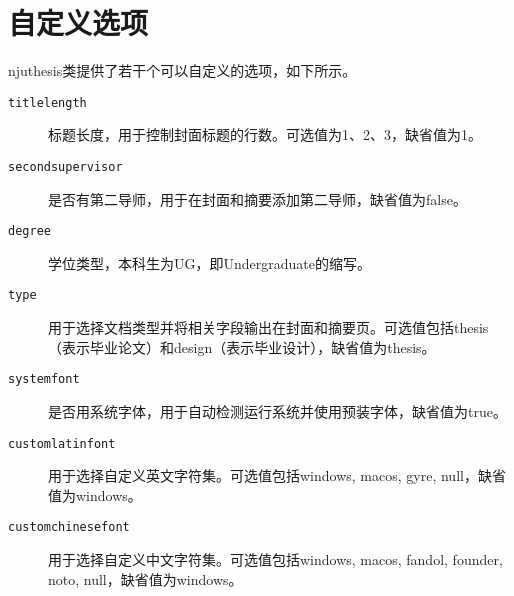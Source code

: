 \section{自定义选项}
\label{sec:classoptions}

njuthesis类提供了若干个可以自定义的选项，如下所示。
\begin{description}
    \item[\texttt{titlelength}] 标题长度，用于控制封面标题的行数。可选值为1、2、3，缺省值为1。
    \item[\texttt{secondsupervisor}] 是否有第二导师，用于在封面和摘要添加第二导师，缺省值为false。
    \item[\texttt{degree}] 学位类型，本科生为UG，即Undergraduate的缩写。
    \item[\texttt{type}] 用于选择文档类型并将相关字段输出在封面和摘要页。可选值包括thesis（表示毕业论文）和design（表示毕业设计），缺省值为thesis。
    \item[\texttt{systemfont}] 是否用系统字体，用于自动检测运行系统并使用预装字体，缺省值为true。
    \item[\texttt{customlatinfont}] 用于选择自定义英文字符集。可选值包括windows, macos, gyre, null，缺省值为windows。
    \item[\texttt{customchinesefont}] 用于选择自定义中文字符集。可选值包括windows, macos, fandol, founder, noto, null，缺省值为windows。
\end{description}
